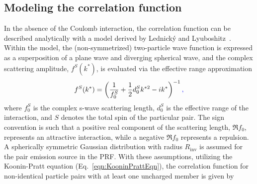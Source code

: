 \documentclass[ALICE,manyauthors]{cernphprep}
\begin{document}
\subsection{Modeling the correlation function}
\label{sec:ModelingCF}


In the absence of the Coulomb interaction, the correlation function can be described analytically with a model derived by Lednick\'y and Lyuboshitz~\cite{Lednicky:82}.
Within the model, the (non-symmetrized) two-particle wave function is expressed as a superposition of a plane wave and diverging spherical wave, and the complex scattering amplitude, $f^{S}(k^{*})$, is evaluated via the effective range approximation{\color{blue}{,}}
\begin{equation}
\begin{aligned}
f^{S}(k^{*}) = \left( \frac{1}{f^{S}_{0}} + \frac{1}{2}d^{S}_{0}k^{*2} - ik^{*} \right)^{-1}{\color{blue}{,}}
\end{aligned}
\label{eqn:ScatteringParam}
\end{equation}
where $f^{S}_{0}$ is the complex s-wave scattering length, $d^{S}_{0}$ is the effective range of the interaction, and $S$ denotes the total spin of the particular pair.
The sign convention is such that a positive real component of the scattering length, $\Re f_{0}$, represents an attractive interaction, while a negative $\Re f_{0}$ represents a repulsion.
A spherically symmetric Gaussian distribution with radius $R_{\mathrm{inv}}$  is assumed for the pair emission source in the PRF.
With these assumptions, utilizing the Koonin-Pratt equation (Eq.~\ref{eqn:KooninPrattEqn}), the correlation function for non-identical particle pairs with at least one uncharged member is given by~\cite{Lednicky:82}
{}
{}
\end{document}
